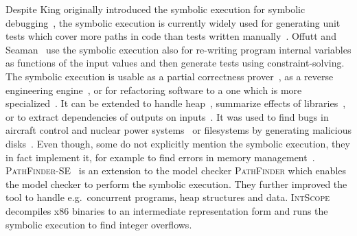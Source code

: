 Despite King originally introduced the symbolic execution for symbolic
debugging~\cite{se_king}, the symbolic execution is currently widely used for
generating unit tests which cover more paths in code than tests written
manually~\cite{se_generate_test1, se_generate_test2, se_generate_test3,
se_generate_test4, se_generate_test5, exe, klee}. Offutt and
Seaman~\cite{se_generate_test2} use the symbolic execution also for re-writing
program internal variables as functions of the input values and then generate
tests using constraint-solving. The symbolic execution is usable as a partial
correctness prover~\cite{se_corr1, se_corr2}, as a reverse engineering
engine~\cite{se_reverse}, or for refactoring software to a one which is more
specialized~\cite{se_spec}. It can be extended to handle heap~\cite{se_heap,
se_gener}, summarize effects of libraries~\cite{se_libs}, or to extract
dependencies of outputs on inputs~\cite{se_output1}. It was used to find bugs
in aircraft control and nuclear power systems~\cite{se_critical} or
filesystems by generating malicious disks~\cite{exe_fs}. Even though, some do
not explicitly mention the symbolic execution, they in fact implement it, for
example to find errors in memory management~\cite{prefix}.
\textsc{PathFinder-SE}~\cite{pathfinder_se} is an extension to the model
checker \textsc{PathFinder} which enables the model checker to perform the
symbolic execution.  They further improved the tool to handle e.g.\ concurrent
programs, heap structures and data.  \textsc{IntScope}~\cite{intscope}
decompiles x86 binaries to an intermediate representation form and runs the
symbolic execution to find integer overflows.
%

